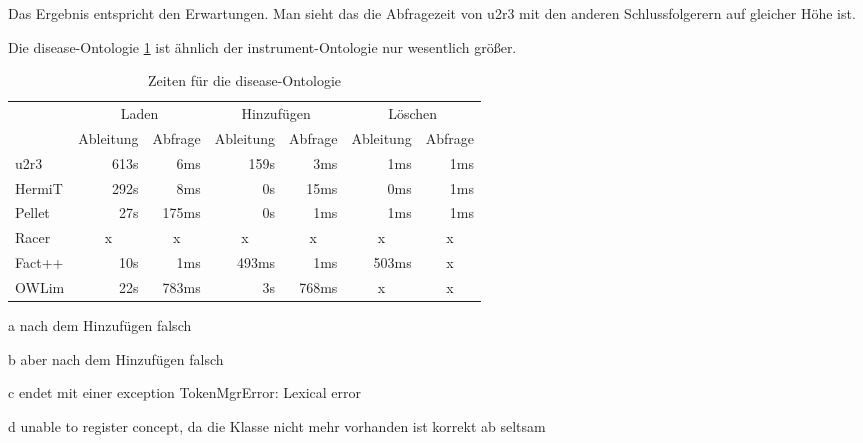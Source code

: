Das Ergebnis entspricht den Erwartungen. Man sieht das die Abfragezeit von u2r3 mit den anderen Schlussfolgerern auf gleicher Höhe ist.

Die disease-Ontologie \ref{table-time-disease} ist ähnlich der instrument-Ontologie nur wesentlich größer.
\begin{table}[htbp]
\caption{Zeiten für die disease-Ontologie}
\label{table-time-disease}
\begin{center}
\begin{threeparttable}
\begin{tabular}{l|r|r|r|r|r|r|}
\cline{2-7}
 & \multicolumn{2}{|c|}{Laden} & \multicolumn{2}{|c|}{Hinzufügen} & \multicolumn{2}{|c|}{Löschen} \\
\cline{2-7}
 & \multicolumn{1}{|c|}{Ableitung} & \multicolumn{1}{|c|}{Abfrage} & \multicolumn{1}{|c|}{Ableitung} & \multicolumn{1}{|c|}{Abfrage} & \multicolumn{1}{|c|}{Ableitung} & \multicolumn{1}{|c|}{Abfrage} \\
\hline
\multicolumn{1}{|l|}{u2r3} & 613s & 6ms & 159s & 3ms & 1ms & 1ms \\ \hline
\multicolumn{1}{|l|}{HermiT\tnote{a}} & 292s & 8ms & 0s & 15ms & 0ms & 1ms \\ \hline
\multicolumn{1}{|l|}{Pellet\tnote{b}} & 27s & 175ms & 0s & 1ms & 1ms & 1ms \\ \hline
\multicolumn{1}{|l|}{Racer\tnote{c}} & \multicolumn{1}{c|}{x} & \multicolumn{1}{c|}{x} & \multicolumn{1}{c|}{x} & \multicolumn{1}{c|}{x} & \multicolumn{1}{c|}{x} & \multicolumn{1}{c|}{x} \\ \hline
\multicolumn{1}{|l|}{Fact++\tnote{d}} & 10s & 1ms & 493ms & 1ms & 503ms & \multicolumn{1}{c|}{x} \\ \hline
\multicolumn{1}{|l|}{OWLim} & 22s & 783ms & 3s & 768ms & \multicolumn{1}{c|}{x} & \multicolumn{1}{c|}{x} \\ \hline
\end{tabular}
\begin{tablenotes}
	\item[a] nach dem Hinzufügen falsch
	\item[b] aber nach dem Hinzufügen falsch
	\item[c] endet mit einer exception TokenMgrError: Lexical error
	\item[d] unable to register concept, da die Klasse nicht mehr vorhanden ist korrekt ab seltsam
\end{tablenotes}
\end{threeparttable}
\end{center}
\end{table}

